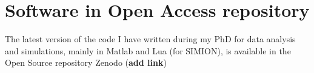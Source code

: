 \chapter{Software in Open Access repository}
The latest version of the code I have written during my PhD for data analysis and simulations, mainly in Matlab and Lua (for SIMION\textsuperscript{\textregistered}), is available in the Open Source repository Zenodo (\textbf{add link})